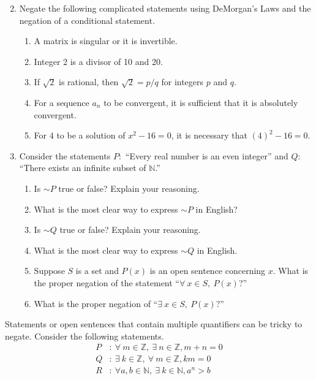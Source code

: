 \documentclass[12 pt]{article}
\newcommand{\Z}{\mathbb{Z}}
\newcommand{\N}{\mathbb{N}}
\theoremstyle{definition}
\theoremstyle{plain}
\theoremstyle{mytheorem}
\theoremstyle{myexample}
\theoremstyle{mydefinition}
\begin{document}
\begin{enumerate}
\setcounter{enumi}{1}
	\item Negate the following complicated statements using DeMorgan's Laws and the negation of a conditional statement.
	\begin{enumerate} \itemsep1in
	\item A matrix is singular or it is invertible.
	\item Integer 2 is a divisor of 10 and 20.
	\item If $\sqrt{2}$ is rational, then $\sqrt{2}= p/q$ for integers $p$ and $q$.
	\item For a sequence $a_n$ to be convergent, it is sufficient that it is absolutely convergent.
	\item For $4$ to be a solution of $x^2-16=0$, it is necessary that $(4)^2-16=0$.
	\vspace{1in}
	\end{enumerate}
	
	\item Consider the statements $P:$ ``Every real number is an even integer'' and $Q:$ ``There exists an infinite subset of $\mathbb{N}$.''
	\begin{enumerate} \itemsep1in
	\item  Is $\sim P$ true or false?  Explain your reasoning.  
	\item What is the most clear way to express $\sim P$ in English?
	\item Is $\sim Q$ true or false?  Explain your reasoning.
	\item What is the most clear way to express $\sim Q$ in English.
	\item Suppose $S$ is a set and $P(x)$ is an open sentence concerning $x$.  What is the proper negation of the statement ``$\forall \ x \in S, \ P(x)$?''
	\item What is the proper negation of ``$\exists \ x\in S, \ P(x)$?''
	\end{enumerate}
\end{enumerate}

\noindent Statements or open sentences that contain multiple quantifiers can be tricky to negate.  Consider the following statements.
	\begin{align*}
	P &: \ \forall \ m \in \Z, \ \exists \ n \in \Z, m+n =0 \\
	Q &: \ \exists \ k \in \Z, \ \forall \ m \in \Z, km = 0\\
	R &: \ \forall a,b \in \N, \ \exists \ k \in \N, a^n > b
	\end{align*}
\end{document}
